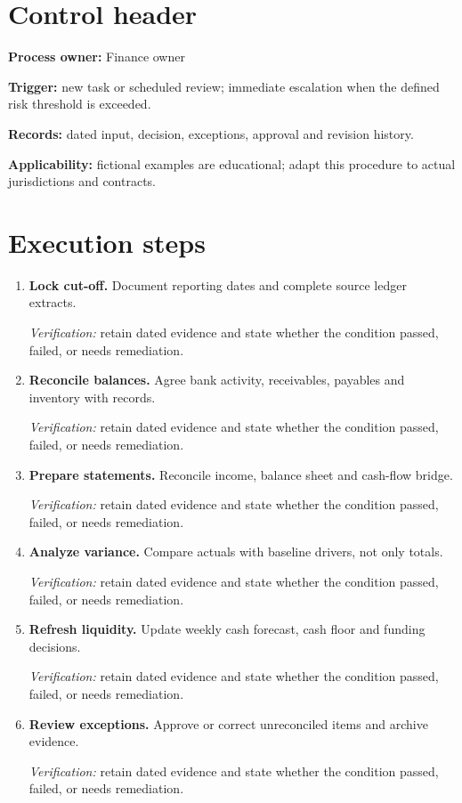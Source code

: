 \documentclass[11pt]{article}
\begin{document}
\SuiteOpen
\section{Control header}
\textbf{Process owner:} Finance owner\par\textbf{Trigger:} new task or scheduled review; immediate escalation when the defined risk threshold is exceeded.\par\textbf{Records:} dated input, decision, exceptions, approval and revision history.\par\textbf{Applicability:} fictional examples are educational; adapt this procedure to actual jurisdictions and contracts.
\section{Execution steps}
\begin{enumerate}[leftmargin=*,itemsep=8pt]
\item \textbf{Lock cut-off.} Document reporting dates and complete source ledger extracts.\par\textit{Verification:} retain dated evidence and state whether the condition passed, failed, or needs remediation.
\item \textbf{Reconcile balances.} Agree bank activity, receivables, payables and inventory with records.\par\textit{Verification:} retain dated evidence and state whether the condition passed, failed, or needs remediation.
\item \textbf{Prepare statements.} Reconcile income, balance sheet and cash-flow bridge.\par\textit{Verification:} retain dated evidence and state whether the condition passed, failed, or needs remediation.
\item \textbf{Analyze variance.} Compare actuals with baseline drivers, not only totals.\par\textit{Verification:} retain dated evidence and state whether the condition passed, failed, or needs remediation.
\item \textbf{Refresh liquidity.} Update weekly cash forecast, cash floor and funding decisions.\par\textit{Verification:} retain dated evidence and state whether the condition passed, failed, or needs remediation.
\item \textbf{Review exceptions.} Approve or correct unreconciled items and archive evidence.\par\textit{Verification:} retain dated evidence and state whether the condition passed, failed, or needs remediation.
\end{enumerate}
\end{document}
